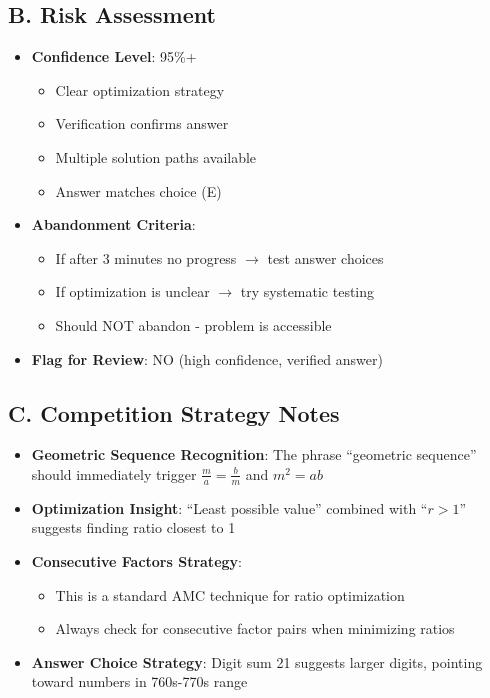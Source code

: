 \documentclass[11pt]{article}
\begin{document}
\begin{competitionbox}
\subsection*{B. Risk Assessment}
\begin{itemize}[leftmargin=*]
    \item \textbf{Confidence Level}: 95\%+
    \begin{itemize}
        \item Clear optimization strategy
        \item Verification confirms answer
        \item Multiple solution paths available
        \item Answer matches choice (E)
    \end{itemize}
    
    \item \textbf{Abandonment Criteria}: 
    \begin{itemize}
        \item If after 3 minutes no progress $\rightarrow$ test answer choices
        \item If optimization is unclear $\rightarrow$ try systematic testing
        \item Should NOT abandon - problem is accessible
    \end{itemize}
    
    \item \textbf{Flag for Review}: NO (high confidence, verified answer)
\end{itemize}

\subsection*{C. Competition Strategy Notes}
\begin{itemize}[leftmargin=*]
    \item \textbf{Geometric Sequence Recognition}: The phrase ``geometric sequence'' should immediately trigger $\frac{m}{a} = \frac{b}{m}$ and $m^2 = ab$
    
    \item \textbf{Optimization Insight}: ``Least possible value'' combined with ``$r > 1$'' suggests finding ratio closest to 1
    
    \item \textbf{Consecutive Factors Strategy}: 
    \begin{itemize}
        \item This is a standard AMC technique for ratio optimization
        \item Always check for consecutive factor pairs when minimizing ratios
    \end{itemize}
    
    \item \textbf{Answer Choice Strategy}: Digit sum 21 suggests larger digits, pointing toward numbers in 760s-770s range
\end{itemize}
\end{competitionbox}
\end{document}
